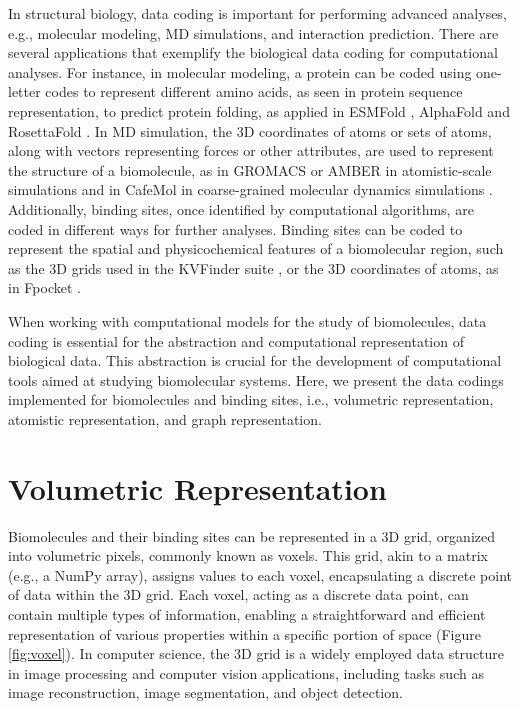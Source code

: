 \documentclass[Ingles]{phdthesis}
\def\ie{i.e.\onedot}
\def\eg{e.g.\onedot}
\begin{document}
In structural biology, data coding is important for performing advanced analyses, \eg, molecular modeling, \ac{MD} simulations, and interaction prediction. There are several applications that exemplify the biological data coding for computational analyses. For instance, in molecular modeling, a protein can be coded using one-letter codes to represent different amino acids, as seen in protein sequence representation, to predict protein folding, as applied in ESMFold \cite{lin2022}, AlphaFold \cite{jumper2021} and RosettaFold \cite{baek2021}. In \acs{MD} simulation, the \acs{3D} coordinates of atoms or sets of atoms, along with vectors representing forces or other attributes, are used to represent the structure of a biomolecule, as in GROMACS \cite{gromacs} or AMBER \cite{amber} in atomistic-scale simulations and in CafeMol in coarse-grained molecular dynamics simulations \cite{kenzaki2011}. Additionally, binding sites, once identified by computational algorithms, are coded in different ways for further analyses. Binding sites can be coded to represent the spatial and physicochemical features of a biomolecular region, such as the \acs{3D} grids used in the KVFinder suite \cite{guerra2019,guerra2020,guerra2021,guerra2023B}, or the \acs{3D} coordinates of atoms, as in Fpocket \cite{fpocket}.

When working with computational models for the study of biomolecules, data coding is essential for the abstraction and computational representation of biological data. This abstraction is crucial for the development of computational tools aimed at studying biomolecular systems. Here, we present the data codings implemented for biomolecules and binding sites, \ie, volumetric representation, atomistic representation, and graph representation.

\section{Volumetric Representation}

Biomolecules and their binding sites can be represented in a \acs{3D} grid, organized into volumetric pixels, commonly known as voxels. This grid, akin to a matrix (\eg, a NumPy array), assigns values to each voxel, encapsulating a discrete point of data within the \acs{3D} grid. Each voxel, acting as a discrete data point, can contain multiple types of information, enabling a straightforward and efficient representation of various properties within a specific portion of space (Figure \ref{fig:voxel}). In computer science, the \acs{3D} grid is a widely employed data structure in image processing and computer vision applications, including tasks such as image reconstruction, image segmentation, and object detection.
\end{document}
